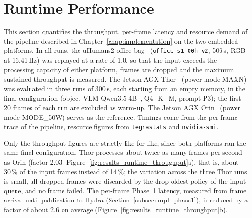 
\section{Runtime Performance}
\label{sec:results_runtime}

{\small This section quantifies the throughput, per-frame latency and resource demand of the pipeline described in Chapter~\ref{chap:implementation} on the two embedded platforms. In all runs, the uHumans2 office bag~\cite{rosinol2021kimera} (\texttt{office\_s1\_00h\_v2}, 506\,s, RGB at 16.41\,Hz) was replayed at a rate of 1.0, so that the input exceeds the processing capacity of either platform, frames are dropped and the maximum sustained throughput is measured. The Jetson AGX Thor~\cite{nvidia_jetson_thor} (power mode MAXN) was evaluated in three runs of 300\,s, each starting from an empty memory, in the final configuration (object VLM Qwen3.5-4B~\cite{qwen2026qwen35}, Q4\_K\_M, prompt P3); the first 20 frames of each run are excluded as warm-up. The Jetson AGX Orin~\cite{nvidia_jetson_orin} (power mode MODE\_50W) serves as the reference. Timings come from the per-frame trace of the pipeline, resource figures from \texttt{tegrastats} and \texttt{nvidia-smi}.\par}

{\small Only the throughput figures are strictly like-for-like, since both platforms ran the same final configuration. Thor processes about twice as many frames per second as Orin (factor 2.03, Figure~\ref{fig:results_runtime_throughput}a), that is, about 30\,\% of the input frames instead of 14\,\%; the variation across the three Thor runs is small, all dropped frames were discarded by the drop-oldest policy of the input queue, and no frame failed. The per-frame Phase~1 latency, measured from frame arrival until publication to Hydra (Section~\ref{subsec:impl_phase1}), is reduced by a factor of about 2.6 on average (Figure~\ref{fig:results_runtime_throughput}b).\par}

